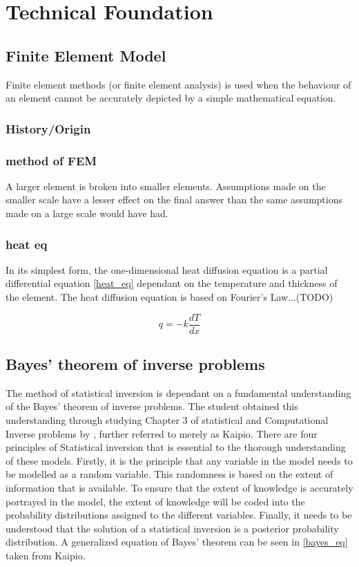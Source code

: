 \chapter{Technical Foundation} \label{tech}
\section{Finite Element Model}
Finite element methods (or finite element analysis) is used when the behaviour of an element cannot be accurately depicted by a simple mathematical equation. 
	\subsection{History/Origin}
	
	
\subsection{method of FEM}
A larger element is broken into smaller elements. 
Assumptions made on the smaller scale have a lesser effect on the final answer than the same assumptions made on a large scale would have had.


\subsection{heat eq}	 
	 In its simplest form, the one-dimensional heat diffusion equation is a partial differential equation \ref{heat_eq} dependant on the temperature and thickness of the element. 
	The heat diffusion equation is based on Fourier's Law...(TODO)
	
	
	\begin{equation}
	\label{heat_eq}
		q = -k \frac{dT}{dx}
	\end{equation}

\section{Bayes' theorem of inverse problems}
	The method of statistical inversion is dependant on a fundamental understanding of the Bayes' theorem of inverse problems. 
	The student obtained this understanding through studying Chapter 3 of statistical and Computational Inverse problems by \citet{Kaipo:2005}, further referred to merely as Kaipio. 
	There are four principles of Statistical inversion that is essential to the thorough understanding of these models. 
	Firstly, it is the principle that any variable in the model needs to be modelled as a random variable. 
	This randomness is based on the extent of information that is available. 
	To ensure that the extent of knowledge is accurately portrayed in the model, the extent of knowledge will be coded into the probability distributions assigned to the different variables. 
	Finally, it needs to be understood that the solution of a statistical inversion is a posterior probability distribution.
	A generalized equation of Bayes' theorem can be seen in \ref{bayes_eq} taken from Kaipio. 
	
